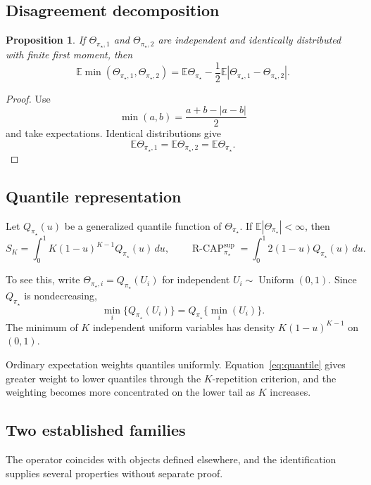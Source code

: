 \documentclass[11pt]{article}
\newcommand{\E}{\mathbb{E}}
\newcommand{\RCAP}{\operatorname{R\text{-}CAP}^{\mathrm{sup}}_{\pi_\star}}
\newtheorem{proposition}{Proposition}
\theoremstyle{remark}
\begin{document}
\subsection{Disagreement decomposition}

\begin{proposition}
If $\Theta_{\pi_\star,1}$ and $\Theta_{\pi_\star,2}$ are independent and identically distributed with finite first moment, then
\[
\E\min(\Theta_{\pi_\star,1},\Theta_{\pi_\star,2})
=
\E\Theta_{\pi_\star}
-
\frac12
\E|\Theta_{\pi_\star,1}-\Theta_{\pi_\star,2}|.
\]
\end{proposition}

\begin{proof}
Use
\[
\min(a,b)=\frac{a+b-|a-b|}{2}
\]
and take expectations. Identical distributions give
\[
\E\Theta_{\pi_\star,1}
=
\E\Theta_{\pi_\star,2}
=
\E\Theta_{\pi_\star}.
\]
\end{proof}

\subsection{Quantile representation}

Let $Q_{\pi_\star}(u)$ be a generalized quantile function of $\Theta_{\pi_\star}$. If $\E|\Theta_{\pi_\star}|<\infty$, then
\begin{equation}
S_K
=
\int_0^1 K(1-u)^{K-1}Q_{\pi_\star}(u)\,du,
\qquad
\RCAP
=
\int_0^1 2(1-u)Q_{\pi_\star}(u)\,du.
\label{eq:quantile}
\end{equation}

To see this, write $\Theta_{\pi_\star,i}=Q_{\pi_\star}(U_i)$ for independent $U_i\sim\operatorname{Uniform}(0,1)$. Since $Q_{\pi_\star}$ is nondecreasing,
\[
\min_i\{Q_{\pi_\star}(U_i)\}
=
Q_{\pi_\star}\{\min_i(U_i)\}.
\]
The minimum of $K$ independent uniform variables has density $K(1-u)^{K-1}$ on $(0,1)$.

Ordinary expectation weights quantiles uniformly. Equation~\eqref{eq:quantile} gives greater weight to lower quantiles through the $K$-repetition criterion, and the weighting becomes more concentrated on the lower tail as $K$ increases.

\subsection{Two established families}
\label{app:families}

The operator coincides with objects defined elsewhere, and the identification supplies several properties without separate proof.
\end{document}
